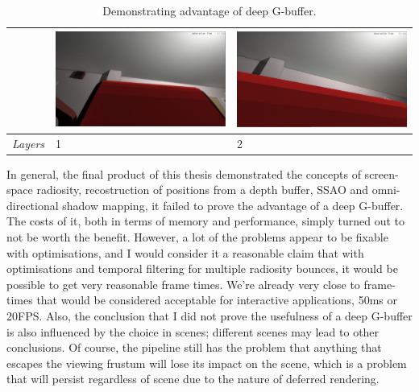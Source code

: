\begin{table}[!ht]
\begin{center}
\begin{tabular}{| c | p{5cm} | p{5cm} |}
\hline
&
\includegraphics[scale=0.15,trim=0 0 0 -5]{img//results/various/1layer-rad} &
\includegraphics[scale=0.15,trim=0 0 0 -5]{img/results/various/2layer-rad} \\
\hline
\emph{Layers} & 1 & 2 \\
\hline
\end{tabular}
\caption{Demonstrating advantage of deep G-buffer.}
\label{table-provingapoint}
\end{center}
\end{table}

In general, the final product of this thesis demonstrated the concepts of screen-space radiosity, recostruction of positions from a depth buffer, SSAO and omni-directional shadow mapping, it failed to prove the advantage of a deep G-buffer. The costs of it, both in terms of memory and performance, simply turned out to not be worth the benefit. However, a lot of the problems appear to be fixable with optimisations, and I would consider it a reasonable claim that with optimisations and temporal filtering for multiple radiosity bounces, it would be possible to get very reasonable frame times. We're already very close to frame-times that would be considered acceptable for interactive applications, 50ms or 20FPS. Also, the conclusion that I did not prove the usefulness of a deep G-buffer is also influenced by the choice in scenes; different scenes may lead to other conclusions. Of course, the pipeline still has the problem that anything that escapes the viewing frustum will lose its impact on the scene, which is a problem that will persist regardless of scene due to the nature of deferred rendering.